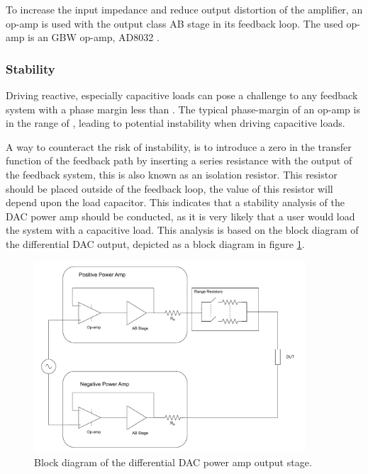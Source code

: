 To increase the input impedance and reduce output distortion of the amplifier, an op-amp is used with the output class AB stage in its feedback loop. The used op-amp is an  GBW op-amp, AD8032 \cite{AD8032_datasheet}. 

\subsubsection{Stability}
Driving reactive, especially capacitive loads can pose a challenge to any feedback system with a phase margin less than . The typical phase-margin of an op-amp is in the range of , leading to potential instability when driving capacitive loads.

A way to counteract the risk of instability, is to introduce a zero in the transfer function of the feedback path by inserting a series resistance with the output of the feedback system, this is also known as an isolation resistor. This resistor should be placed outside of the feedback loop, the value of this resistor will depend upon the load capacitor. This indicates that a stability analysis of the DAC power amp should be conducted, as it is very likely that a user would load the system with a capacitive load. This analysis is based on the block diagram of the differential DAC output, depicted as a block diagram in figure \ref{fig_7_1_1_5_DAC_POWER_AMP_BLOCK}. 


\begin{figure}[H]
    \centering
    \includegraphics[clip, trim=0 0 0 0, width=0.9\textwidth]{Sections/7_SystemDesign/Figures/DAC_POWER_BLOCK.pdf}
    \caption{Block diagram of the differential DAC power amp output stage.}
    \label{fig_7_1_1_5_DAC_POWER_AMP_BLOCK}
\end{figure}


